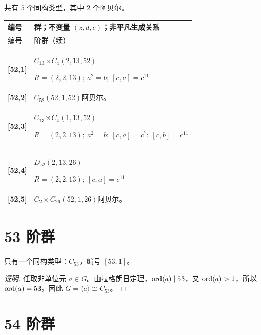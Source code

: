 \documentclass[UTF8,fontset=fandol,11pt,a4paper]{ctexart}
\begin{document}
共有 $5$ 个同构类型，其中 $2$ 个阿贝尔。

\begingroup\small\setlength{\tabcolsep}{3pt}\renewcommand{\arraystretch}{1.12}

\begin{longtable}{@{}p{17mm}>{\raggedright\arraybackslash}p{141mm}@{}}

\toprule 编号 & 群；不变量 $(z,d,e)$；非平凡生成关系\\\midrule\endfirsthead

\toprule 编号 & 52 阶群（续）\\\midrule\endhead\bottomrule\endfoot

\textbf{[52,1]} & $C_{13}\rtimes C_{4}$\quad $(2,13,52)$\par\(R=(2,2,13);\allowbreak\ a^{2}=b;\allowbreak\ [c,a]=c^{11}\)\\[3pt]

\textbf{[52,2]} & $C_{52}$\quad $(52,1,52)$\quad 阿贝尔。\\[3pt]

\textbf{[52,3]} & $C_{13}\rtimes C_{4}$\quad $(1,13,52)$\par\(R=(2,2,13);\allowbreak\ a^{2}=b;\allowbreak\ [c,a]=c^{7};\allowbreak\ [c,b]=c^{11}\)\\[3pt]

\textbf{[52,4]} & $D_{52}$\quad $(2,13,26)$\par\(R=(2,2,13);\allowbreak\ [c,a]=c^{11}\)\\[3pt]

\textbf{[52,5]} & $C_{2}\times C_{26}$\quad $(52,1,26)$\quad 阿贝尔。\\[3pt]

\end{longtable}\endgroup

\section*{53 阶群}\label{order:53}

只有一个同构类型：$C_{53}$，编号 $[53,1]$。

\begin{proof}[证明]
任取非单位元 $a\in G$。由拉格朗日定理，$\operatorname{ord}(a)\mid 53$，又 $\operatorname{ord}(a)>1$，所以 $\operatorname{ord}(a)=53$。因此 $G=\langle a\rangle\cong C_{53}$。
\end{proof}

\section*{54 阶群}\label{order:54}
\end{document}
